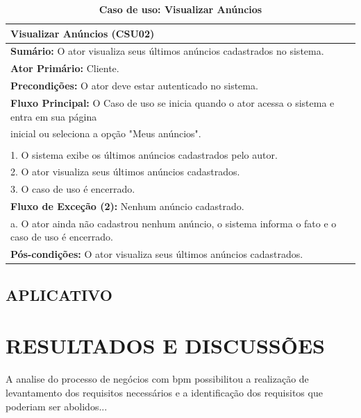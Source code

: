 \documentclass[
	12pt,				%
	openright,			%
	oneside,			%
	a4paper,			%
	chapter=TITLE,		%
	section=TITLE,		%
	english,			%
	french,				%
	spanish,			%
	brazil				%
	]{abntex2}
\begin{document}
\begin{table}[h!]
	\center\scriptsize
	\caption{\textbf{Caso de uso: Visualizar Anúncios}}
	\begin{tabular}{|l|} \hline \label{tab-csu-visualizarAnuncios}
		\textbf{Visualizar Anúncios (CSU02)} \\ \hline
		
		\textbf{Sumário:} O ator visualiza seus últimos anúncios cadastrados no sistema. \\
		\textbf{Ator Primário:} Cliente. \\
		\textbf{Precondições:} O ator deve estar autenticado no sistema. \\ \hline
		
		\textbf{Fluxo Principal:} O Caso de uso se inicia quando o ator acessa o sistema e entra em sua página \\ inicial ou seleciona a opção "Meus anúncios". \\ \\
		

		1.	O sistema exibe os últimos anúncios cadastrados pelo autor. \\
		2.	O ator visualiza seus últimos anúncios cadastrados. \\
		3.	O caso de uso é encerrado. \\ \hline
		
		\textbf{Fluxo de Exceção (2):} Nenhum anúncio cadastrado.\\
		a. O ator ainda não cadastrou nenhum anúncio, o sistema informa o fato e o caso de uso é encerrado.\\ \hline
		
		\textbf{Pós-condições:} O ator visualiza seus últimos anúncios cadastrados. \\ \hline
		
	\end{tabular}
\end{table}

\section{APLICATIVO}


\chapter{RESULTADOS E DISCUSSÕES}

A analise do processo de negócios com bpm possibilitou a realização de levantamento dos requisitos necessários e a identificação dos requisitos que poderiam ser abolidos...
\end{document}

